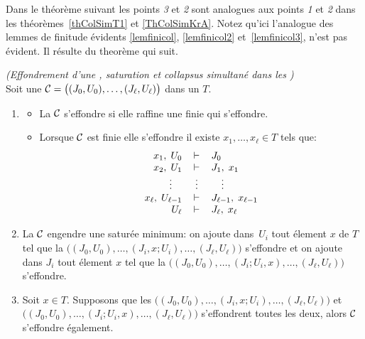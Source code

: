 Dans le théorème suivant les points \emph{3} et \emph{2} sont analogues aux points \emph{1} 
et \emph{2} dans les théorèmes~\ref{thColSimT1} et \ref{ThColSimKrA}.
Notez qu'ici l'analogue des lemmes de finitude évidents \ref{lemfinicol}, \ref{lemfinicol2} et~\ref{lemfinicol3}, n'est pas évident.
Il résulte du theorème qui suit.
\begin{theorem}
\label{thColSimT2} {\em (Effondrement d'une \proc, saturation et collapsus simultané dans les
\trdis)} ~\\
Soit une  \proc ${\cal C}=\big((J_0,U_0),\ldots,(J_\ell,U_\ell)\big)$ dans un \trdi
$T.$
\begin{enumerate}
\item  
\begin{itemize}
%
\item La  \proc ${\cal C}$ s'effondre si elle raffine une \proc finie qui s'effondre.
%
\item Lorsque ${\cal C}$ est finie elle s'effondre \ssi 
 il existe $x_1,\ldots,x_\ell\in T$ tels que:
\begin{equation} \label {eqthColSimT2}
\begin{array}{rcl}
 x_1,\;   U_0& \,\vdash\,  &  J_0  \\
 x_2,\;   U_1& \,\vdash\,  &  J_1 ,\;  x_1  \\
\vdots\quad & \vdots  & \quad\vdots  \\
 x_\ell,\;   U_{\ell-1}& \,\vdash\,  &  J_{\ell-1} ,\;  x_{\ell-1}  \\
  U_\ell& \,\vdash\,  &  J_\ell ,\;  x_\ell
\end{array}
\end{equation}

\end{itemize}
%
\item  La \proc ${\cal C}$ engendre une \proc saturée minimum:
on ajoute dans~$U_i$  tout  élement $x$ de $T$  tel que la \proc
$\big((J_0,U_0),\ldots,(J_i,x;U_i),\ldots,(J_\ell,U_\ell)\big)$ s'effondre
et on ajoute dans $J_i$ tout élement $x$  tel que la \proc $\big((J_0,U_0),\ldots,(J_i;U_i,x),\ldots,(J_\ell,U_\ell)\big)$
s'effondre.
%
\item  Soit $x\in T$. Supposons que les \procs
$\big((J_0,U_0),\ldots,(J_i,x;U_i),\ldots,(J_\ell,U_\ell)\big)$
et
$\big((J_0,U_0),\ldots,(J_i;U_i,x),\ldots,(J_\ell,U_\ell)\big)$
s'effondrent toutes les deux, alors ${\cal C}$ s'effondre également.
%
\end{enumerate}
\end{theorem}
